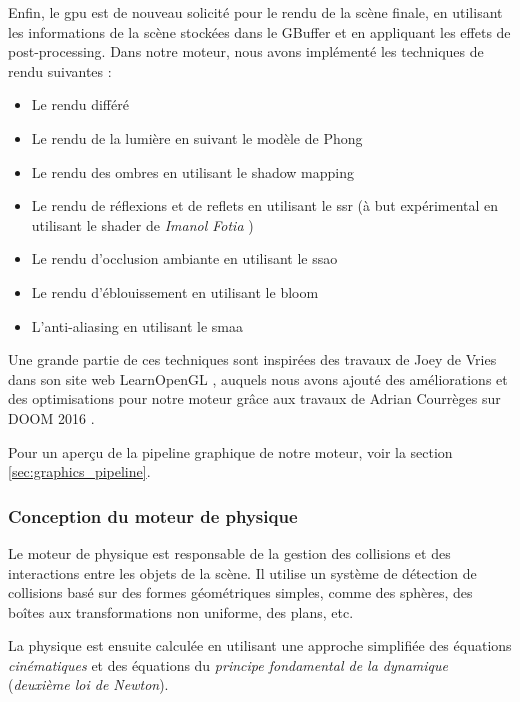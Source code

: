     \newpage
    Enfin, le \gls{gpu} est de nouveau solicité pour le rendu de la scène
    finale, en utilisant les informations de la scène stockées dans le
    \gls{GBuffer} et en appliquant les effets de post-processing.
    Dans notre moteur, nous avons implémenté les techniques de rendu suivantes :
    \begin{multicols}{2}
    \begin{itemize}
        \item Le rendu différé
        \item Le rendu de la lumière en suivant le modèle de Phong 
        \item Le rendu des ombres en utilisant le \gls{shadow mapping}
        \item Le rendu de réflexions et de reflets en utilisant le \gls{ssr} (à but expérimental en utilisant le \gls{shader} de \emph{Imanol Fotia} \cite{imanolfotia})
        \item Le rendu d'occlusion ambiante en utilisant le \gls{ssao}
        \item Le rendu d'éblouissement en utilisant le \gls{bloom}
        \item L'anti-aliasing en utilisant le \gls{smaa}
    \end{itemize}
    \end{multicols}

    Une grande partie de ces techniques sont inspirées des travaux de Joey de Vries
    dans son site web LearnOpenGL \cite{learnopengl}, auquels nous avons
    ajouté des améliorations et des optimisations pour notre moteur grâce
    aux travaux de Adrian Courrèges sur DOOM 2016 \cite{courreges_doom2016}.

    Pour un aperçu de la pipeline graphique de notre moteur, voir la section
    \ref{sec:graphics_pipeline}.

\subsubsection{Conception du moteur de physique}

    Le moteur de physique est responsable de la gestion des collisions et
    des interactions entre les objets de la scène. Il utilise un système de
    détection de collisions basé sur des formes géométriques simples, comme
    des sphères, des boîtes aux transformations non uniforme, des plans, etc.

    La physique est ensuite calculée en utilisant une approche simplifiée des
    équations \emph{cinématiques} et des équations du \emph{principe fondamental de la dynamique}
    (\emph{deuxième loi de Newton}).


